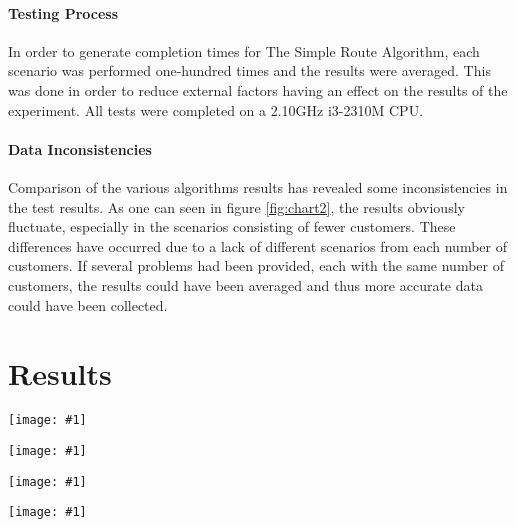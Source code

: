 \documentclass[conference]{acmsiggraph}
\newcommand{\figuremacroF}[4]{
	\begin{figure*}[t] %
		\centering
		\texttt{[image: \#1]}
		\caption[#2]{\textbf{#2} - #3}
		\label{fig:#1}
	\end{figure*}
}
\begin{document}
		\paragraph{Testing Process}
		In order to generate completion times for The Simple Route Algorithm, each scenario was performed one-hundred times and the results were averaged. This was done in order to reduce external factors having an effect on the results of the experiment. All tests were completed on a 2.10GHz i3-2310M CPU.
		
		\paragraph{Data Inconsistencies}
		 Comparison of the various algorithms results has revealed some inconsistencies in the test results.
		 As one can seen in  figure \ref{fig:chart2}, the results obviously fluctuate, especially in the scenarios consisting of fewer customers. These differences have occurred due to a lack of different scenarios from each number of customers. If several problems had been provided, each with the same number of customers, the results could have been averaged and thus more accurate data could have been collected.
		 
		
		
	\section{Results}
	
	\figuremacroF{chart1}
	{Simple Route Time Results}{Average completion time of The Simple Route Algorithm compared to number of customers.}
	{1.0}
	
	\figuremacroF{chart3}
	{Simple Route vs Single Customer per Route}{The difference in cost when comparing The Simple Route against The Single Customer per Route Algorithm.}
	{1.0}
	
	\figuremacroF{chart2}
	{Simple Route Percentile Saving}{The percentage difference between using The Simple Route Algorithm compared to The Single Customer per Route Algorithm.}
	{1.0}

	\figuremacroF{chart4}
	{Simple Route vs Clarke Wright}{The difference in cost when comparing the Simple Route  against the Clarke Wright Algorithm}
	{1.0}
\end{document}

